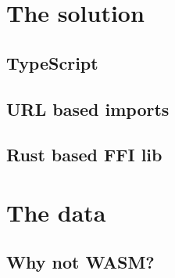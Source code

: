 \documentclass[12pt, letterpaper]{article}
\begin{document}
\begin{multicols}{2}
    \section{The solution}
    \subsection{TypeScript}
    \subsection{URL based imports}
    \subsection{Rust based FFI lib}
    \section{The data}
    \subsection{Why not WASM?}
\end{multicols}
\end{document}
